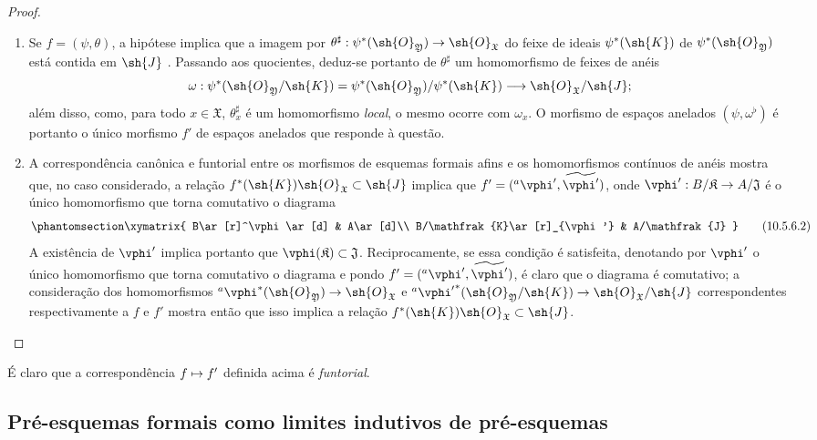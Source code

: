 \documentclass[oneside]{amsart}
\makeatletter
\newcommand{\ega@arrow}[2]{\mathchoice{#1}{#2}{#2}{#2}}
\let\ega@shortmapsto\mapsto
\renewcommand{\to}{\ega@arrow{\longrightarrow}{\rightarrow}}
\renewcommand{\mapsto}{\ega@arrow{\longmapsto}{\ega@shortmapsto}}
\let\EGAOriginalLabel\label
\renewcommand{\label}[1]{\phantomsection\EGAOriginalLabel{#1}}
\makeatother
\begin{document}
\begin{proof}
\medskip\noindent
\begin{enumerate}
  \item[\rm{(i)}] Se $f=(\psi,\theta)$, a hipótese implica que a imagem por $\theta^\sharp:\psi^*(\sh{O}_\mathfrak{Y})\to\sh{O}_\mathfrak{X}$ do feixe de ideais $\psi^*(\sh{K})$ de $\psi^*(\sh{O}_\mathfrak{Y})$ está contida em $\sh{J}$ .
    Passando aos quocientes, deduz-se portanto de $\theta^\sharp$ um homomorfismo de feixes de anéis
    \[
      \omega:\psi^*(\sh{O}_\mathfrak{Y}/\sh{K})=\psi^*(\sh{O}_\mathfrak{Y})/\psi^*(\sh{K})\to\sh{O}_\mathfrak{X}/\sh{J};
    \]
    além disso, como, para todo $x\in\mathfrak{X}$, $\theta_x^\sharp$ é um homomorfismo \emph{local}, o mesmo ocorre com $\omega_x$.
    O morfismo de espaços anelados $(\psi,\omega^\flat)$ é portanto  o único morfismo $f'$ de espaços anelados que responde à questão.
  \item[\rm{(ii)}] A correspondência canônica e funtorial entre os morfismos de esquemas formais afins e os homomorfismos contínuos de anéis  mostra que, no caso considerado, a relação $f^*(\sh{K})\sh{O}_\mathfrak{X}\subset\sh{J}$ implica que $f'=({}^a\vphi',\widetilde{\vphi'})$, onde $\vphi':B/\mathfrak{K}\to A/\mathfrak{J}$ é o único homomorfismo que torna comutativo o diagrama
    \[
    \label{I.10.5.6.2}
      \xymatrix{
        B\ar[r]^\vphi\ar[d] &
        A\ar[d]\\
        B/\mathfrak{K}\ar[r]_{\vphi'} &
        A/\mathfrak{J}
      }
      \tag{10.5.6.2}
    \]
    A existência de $\vphi'$ implica portanto que $\vphi(\mathfrak{K})\subset\mathfrak{J}$.
    Reciprocamente, se essa condição é satisfeita, denotando por $\vphi'$ o único homomorfismo que torna comutativo o diagrama  e pondo $f'=({}^a\vphi',\widetilde{\vphi'})$, é claro que o diagrama  é comutativo; a consideração dos homomorfismos ${}^a\vphi^*(\sh{O}_\mathfrak{Y})\to\sh{O}_\mathfrak{X}$ e ${}^a{\vphi'}^*(\sh{O}_\mathfrak{Y}/\sh{K})\to\sh{O}_\mathfrak{X}/\sh{J}$ correspondentes respectivamente a $f$ e $f'$ mostra então que isso implica a relação $f^*(\sh{K})\sh{O}_\mathfrak{X}\subset\sh{J}$.
\end{enumerate}
\end{proof}

É claro que a correspondência $f\mapsto f'$ definida acima é \emph{funtorial}.

\subsection{Pré-esquemas formais como limites indutivos de pré-esquemas}
\label{subsection:I.10.6}
\end{document}
